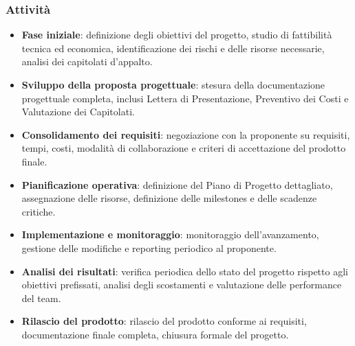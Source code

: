 	\subsubsection{Attività}
	\begin{itemize}[itemsep=3pt, parsep=1pt, label=$\scriptstyle\bullet$]
	    \item \textbf{Fase iniziale}: definizione degli obiettivi del progetto, studio di fattibilità tecnica ed economica, identificazione dei rischi e delle risorse necessarie, analisi dei capitolati d'appalto.
	    \item \textbf{Sviluppo della proposta progettuale}: stesura della documentazione progettuale completa, inclusi Lettera di Presentazione, Preventivo dei Costi e Valutazione dei Capitolati.
	    \item \textbf{Consolidamento dei requisiti}: negoziazione con la proponente su requisiti, tempi, costi, modalità di collaborazione e criteri di accettazione del prodotto finale.
	    \item \textbf{Pianificazione operativa}: definizione del Piano di Progetto dettagliato, assegnazione delle risorse, definizione delle milestones e delle scadenze critiche.
	    \item \textbf{Implementazione e monitoraggio}: monitoraggio dell’avanzamento, gestione delle modifiche e reporting periodico al proponente.
	    \item \textbf{Analisi dei risultati}: verifica periodica dello stato del progetto rispetto agli obiettivi prefissati, analisi degli scostamenti e valutazione delle performance del team.
	    \item \textbf{Rilascio del prodotto}: rilascio del prodotto conforme ai requisiti, documentazione finale completa, chiusura formale del progetto.
	\end{itemize}
	
